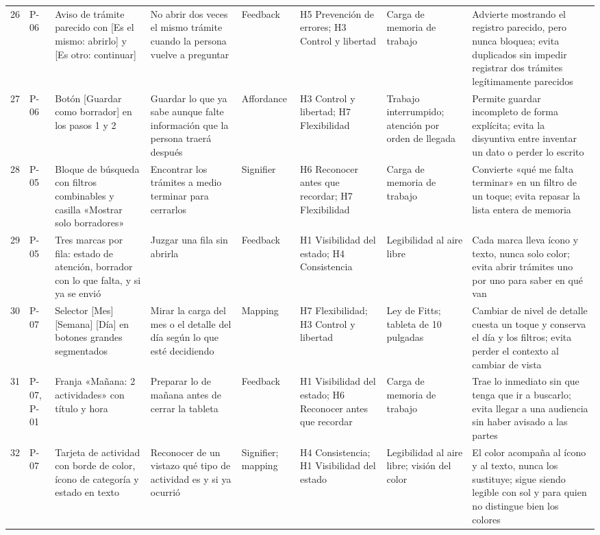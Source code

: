 \begin{longtable}{@{}p{0.6cm}p{1.5cm}p{3.6cm}p{3.4cm}p{2.2cm}p{2.8cm}p{2.3cm}p{4.6cm}@{}}
26 & P-06 & Aviso de trámite parecido con [Es el mismo: abrirlo] y [Es otro: continuar] & No abrir dos veces el mismo trámite cuando la persona vuelve a preguntar & Feedback & H5 Prevención de errores; H3 Control y libertad & Carga de memoria de trabajo & Advierte mostrando el registro parecido, pero nunca bloquea; evita duplicados sin impedir registrar dos trámites legítimamente parecidos \\
27 & P-06 & Botón [Guardar como borrador] en los pasos 1 y 2 & Guardar lo que ya sabe aunque falte información que la persona traerá después & Affordance & H3 Control y libertad; H7 Flexibilidad & Trabajo interrumpido; atención por orden de llegada & Permite guardar incompleto de forma explícita; evita la disyuntiva entre inventar un dato o perder lo escrito \\
28 & P-05 & Bloque de búsqueda con filtros combinables y casilla «Mostrar solo borradores» & Encontrar los trámites a medio terminar para cerrarlos & Signifier & H6 Reconocer antes que recordar; H7 Flexibilidad & Carga de memoria de trabajo & Convierte «qué me falta terminar» en un filtro de un toque; evita repasar la lista entera de memoria \\
29 & P-05 & Tres marcas por fila: estado de atención, borrador con lo que falta, y si ya se envió & Juzgar una fila sin abrirla & Feedback & H1 Visibilidad del estado; H4 Consistencia & Legibilidad al aire libre & Cada marca lleva ícono y texto, nunca solo color; evita abrir trámites uno por uno para saber en qué van \\
30 & P-07 & Selector [Mes] [Semana] [Día] en botones grandes segmentados & Mirar la carga del mes o el detalle del día según lo que esté decidiendo & Mapping & H7 Flexibilidad; H3 Control y libertad & Ley de Fitts; tableta de 10 pulgadas & Cambiar de nivel de detalle cuesta un toque y conserva el día y los filtros; evita perder el contexto al cambiar de vista \\
31 & P-07, P-01 & Franja «Mañana: 2 actividades» con título y hora & Preparar lo de mañana antes de cerrar la tableta & Feedback & H1 Visibilidad del estado; H6 Reconocer antes que recordar & Carga de memoria de trabajo & Trae lo inmediato sin que tenga que ir a buscarlo; evita llegar a una audiencia sin haber avisado a las partes \\
32 & P-07 & Tarjeta de actividad con borde de color, ícono de categoría y estado en texto & Reconocer de un vistazo qué tipo de actividad es y si ya ocurrió & Signifier; mapping & H4 Consistencia; H1 Visibilidad del estado & Legibilidad al aire libre; visión del color & El color acompaña al ícono y al texto, nunca los sustituye; sigue siendo legible con sol y para quien no distingue bien los colores \\

\end{longtable}
